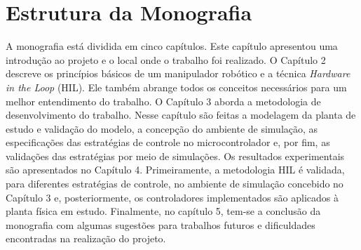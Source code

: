 \section{Estrutura da Monografia}

A monografia está dividida em cinco capítulos. Este capítulo apresentou uma introdução 
ao projeto e o local onde o trabalho foi realizado. O Capítulo 2 descreve 
os princípios básicos de um manipulador robótico e a técnica \emph{Hardware in the 
Loop} (HIL). Ele também abrange todos os conceitos necessários para um melhor 
entendimento do trabalho. O Capítulo 3 aborda a metodologia de desenvolvimento do trabalho. 
Nesse capítulo são feitas a modelagem da planta de estudo e validação do modelo, a 
concepção do ambiente de simulação, as especificações das estratégias de controle no 
microcontrolador e, por fim, as validações das estratégias por meio de simulações. 
Os resultados experimentais são apresentados no Capítulo 4. Primeiramente, a 
metodologia HIL é validada, para diferentes estratégias de controle, no ambiente 
de simulação concebido no Capítulo 3 e, posteriormente, os controladores 
implementados são aplicados à planta física em estudo. 
Finalmente, no capítulo 5, tem-se a conclusão da  monografia com algumas sugestões 
para trabalhos futuros e dificuldades encontradas na realização do projeto.


\clearpage